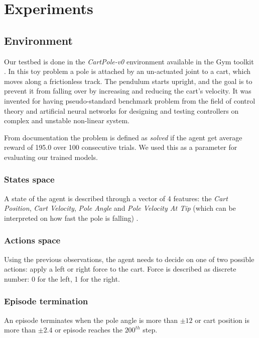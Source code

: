 \section{Experiments}

\subsection{Environment}
Our testbed is done in the \textit{CartPole-v0} environment available in the Gym toolkit \cite{Gym}.
In this toy problem a pole is attached by an un-actuated joint to a cart, which moves along a frictionless track. The pendulum starts upright, and the goal is to prevent it from falling over by increasing and reducing the cart's velocity. It was invented for having pseudo-standard benchmark problem from the field of control theory and artificial neural networks for designing and testing controllers on complex and unstable non-linear system.

From documentation the problem is defined as \textit{solved} if the agent get average reward of 195.0 over 100 consecutive trials. We used this as a parameter for evaluating our trained models.
 
\subsubsection{States space}
A state of the agent is described through a vector of 4 features: the  \textit{Cart Position}, \textit{Cart Velocity}, \textit{Pole Angle} and \textit{Pole Velocity At Tip} (which can be interpreted on how fast the pole is falling) .

\subsubsection{Actions space}
Using the previous observations, the agent needs to decide on one of two possible actions: apply a left or right force to the cart. Force is described as discrete number: 0 for the left, 1 for the right.




\subsubsection{Episode termination}
An episode terminates when the pole angle is more than $\pm12$ or cart position is more than $\pm2.4$ or episode reaches the $200^{th}$ step.

